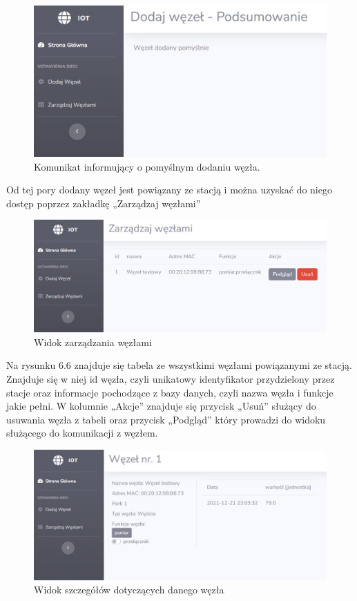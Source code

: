 \documentclass[12pt, twoside, openany]{mwrep}
\begin{document}
\begin{figure}[H]
\centering
\includegraphics[width=\textwidth]{test3}
\caption{Komunikat informujący o pomyślnym dodaniu węzła.}
\end{figure}
\par
Od tej pory dodany węzeł jest powiązany ze stacją i można uzyskać do niego dostęp poprzez zakładkę „Zarządzaj węzłami”
\begin{figure}[H]
\centering
\includegraphics[width=\textwidth]{test4}
\caption{Widok zarządzania węzłami}
\end{figure}
\par
Na rysunku 6.6 znajduje się tabela ze wszystkimi węzłami powiązanymi ze stacją. Znajduje się w niej id węzła, czyli unikatowy identyfikator przydzielony przez stacje oraz informacje pochodzące z bazy danych, czyli nazwa węzła i funkcje jakie pełni. W kolumnie „Akcje” znajduje się przycisk „Usuń” służący do usuwania węzła z tabeli oraz przycisk „Podgląd” który prowadzi do widoku służącego do komunikacji z węzłem. 
\begin{figure}[H]
\centering
\includegraphics[width=\textwidth]{test5}
\caption{Widok szczegółów dotyczących danego węzła}
\end{figure}
\end{document}
